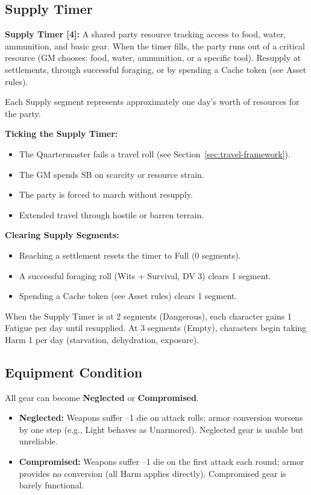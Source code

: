 \subsection{Supply Timer}
\label{sec:supply-timer}

\textbf{Supply Timer [4]:} A shared party resource tracking access to food, water, ammunition, and basic gear. When the timer fills, the party runs out of a critical resource (GM chooses: food, water, ammunition, or a specific tool). Resupply at settlements, through successful foraging, or by spending a Cache token (see Asset rules).

Each Supply segment represents approximately one day's worth of resources for the party.

\textbf{Ticking the Supply Timer:}
\begin{itemize}
  \item The Quartermaster fails a travel roll (see Section~\ref{sec:travel-framework}).
  \item The GM spends SB on scarcity or resource strain.
  \item The party is forced to march without resupply.
  \item Extended travel through hostile or barren terrain.
\end{itemize}

\textbf{Clearing Supply Segments:}
\begin{itemize}
  \item Reaching a settlement resets the timer to Full (0 segments).
  \item A successful foraging roll (Wits + Survival, DV 3) clears 1 segment.
  \item Spending a Cache token (see Asset rules) clears 1 segment.
\end{itemize}

When the Supply Timer is at 2 segments (Dangerous), each character gains 1 Fatigue per day until resupplied. At 3 segments (Empty), characters begin taking Harm 1 per day (starvation, dehydration, exposure).

\subsection{Equipment Condition}

All gear can become \textbf{Neglected} or \textbf{Compromised}.

\begin{itemize}
  \item \textbf{Neglected:} Weapons suffer --1 die on attack rolls; armor conversion worsens by one step (e.g., Light behaves as Unarmored). Neglected gear is usable but unreliable.
  \item \textbf{Compromised:} Weapons suffer --1 die on the first attack each round; armor provides no conversion (all Harm applies directly). Compromised gear is barely functional.
\end{itemize}

